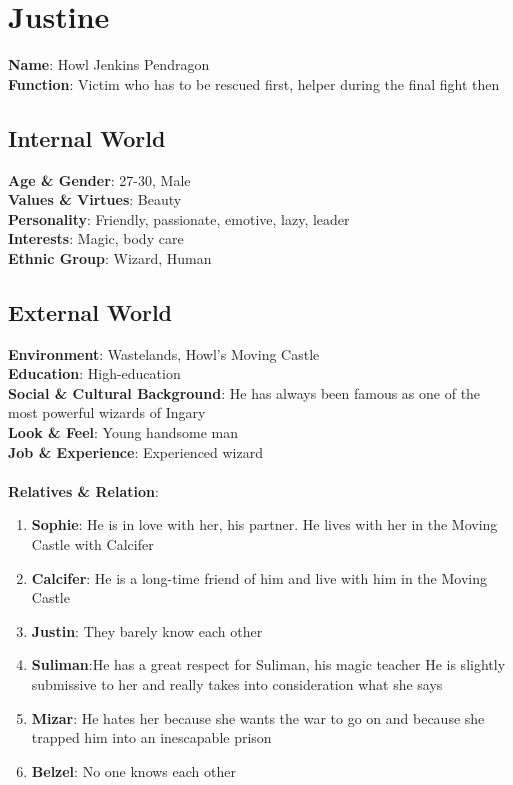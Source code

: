 \section{Justine}

\textbf{Name}: Howl Jenkins Pendragon \\
\textbf{Function}: Victim who has to be rescued first, helper during the final fight then

\subsection{Internal World}

\textbf{Age \& Gender}: 27-30, Male \\
\textbf{Values \& Virtues}: Beauty \\
\textbf{Personality}: Friendly, passionate, emotive, lazy, leader \\
\textbf{Interests}: Magic, body care \\
\textbf{Ethnic Group}: Wizard, Human

\subsection{External World}
\textbf{Environment}: Wastelands, Howl’s Moving Castle \\
\textbf{Education}: High-education \\
\textbf{Social \& Cultural Background}: He has always been famous as one of the most powerful wizards of Ingary \\
\textbf{Look \& Feel}: Young handsome man   \\
\textbf{Job \& Experience}: Experienced wizard \\
\\
\textbf{Relatives \& Relation}:
\begin{enumerate}
\item \textbf{Sophie}: He is in love with her, his partner. He lives with her in the Moving Castle
        with Calcifer
\item \textbf{Calcifer}: He is a long-time friend of him and live with him in the Moving Castle
\item \textbf{Justin}: They barely know each other
\item \textbf{Suliman}:He has a great respect for Suliman, his magic teacher
             He is slightly submissive to her and really takes into consideration what she says
\item \textbf{Mizar}: He hates her because she wants the war to go on and because she trapped him into an inescapable prison 
\item \textbf{Belzel}: No one knows each other
\end{enumerate}

